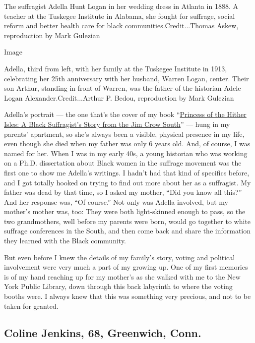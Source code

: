 The suffragist Adella Hunt Logan in her wedding dress in Atlanta in
1888. A teacher at the Tuskegee Institute in Alabama, she fought for
suffrage, social reform and better health care for black
communities.Credit...Thomas Askew, reproduction by Mark Gulezian

Image

Adella, third from left, with her family at the Tuskegee Institute in
1913, celebrating her 25th anniversary with her husband, Warren Logan,
center. Their son Arthur, standing in front of Warren, was the father of
the historian Adele Logan Alexander.Credit...Arthur P. Bedou,
reproduction by Mark Gulezian

Adella's portrait --- the one that's the cover of my book
``\href{https://yalebooks.yale.edu/book/9780300242607/princess-hither-isles}{Princess
of the Hither Isles: A Black Suffragist's Story from the Jim Crow
South}'' --- hung in my parents' apartment, so she's always been a
visible, physical presence in my life, even though she died when my
father was only 6 years old. And, of course, I was named for her. When I
was in my early 40s, a young historian who was working on a Ph.D.
dissertation about Black women in the suffrage movement was the first
one to show me Adella's writings. I hadn't had that kind of specifics
before, and I got totally hooked on trying to find out more about her as
a suffragist. My father was dead by that time, so I asked my mother,
``Did you know all this?'' And her response was, ``Of course.'' Not only
was Adella involved, but my mother's mother was, too: They were both
light-skinned enough to pass, so the two grandmothers, well before my
parents were born, would go together to white suffrage conferences in
the South, and then come back and share the information they learned
with the Black community.

But even before I knew the details of my family's story, voting and
political involvement were very much a part of my growing up. One of my
first memories is of my hand reaching up for my mother's as she walked
with me to the New York Public Library, down through this back labyrinth
to where the voting booths were. I always knew that this was something
very precious, and not to be taken for granted.

\hypertarget{coline-jenkins-68-greenwich-conn}{%
\subsection{Coline Jenkins, 68, Greenwich,
Conn.}\label{coline-jenkins-68-greenwich-conn}}

